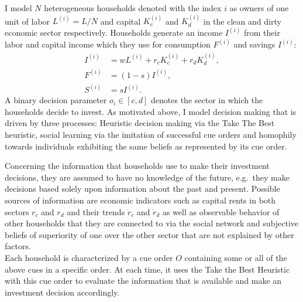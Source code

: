 I model $N$ heterogeneous households denoted with the index $i$ as owners of one unit of labor $L^{(i)} = L/N$ and capital $K_c^{(i)}$ and $K_d^{(i)}$ in the clean and dirty economic sector respectively.
Households generate an income $I^{(i)}$ from their labor and capital income which they use for consumption $F^{(i)}$ and savings $I^{(i)}$:
\begin{align}
	I^{(i)} &= w L^{(i)} + r_c K_c^{(i)} + r_d K_d^{(i)}, \label{eq:household_income} \\
	F^{(i)} &= (1-s) I^{(i)}, \label{eq:consumption} \\
	S^{(i)} &= s I^{(i)}. \label{eq:savings}
\end{align}
A binary decision parameter $o_i \in [c,d]$ denotes the sector in which the households decide to invest. As motivated above, I model decision making that is driven by three processes: Heuristic decision making via the Take The Best heuristic, social learning via the imitation of successful cue orders and homophily towards individuals exhibiting the same beliefs as represented by its cue order. \par

Concerning the information that households use to make their investment decisions, they are assumed to have no knowledge of the future, e.g.\ they make decisions based solely upon information about the past and present. Possible sources of information are economic indicators such as capital rents in both sectors $r_c$ and $r_d$ and their trends $\dot{r}_c$ and $\dot{r}_d$ as well as observable behavior of other households that they are connected to via the social network and subjective beliefs of superiority of one over the other sector that are not explained by other factors.\\
Each household is characterized by a cue order $O$ containing some or all of the above cues in a specific order. At each time, it uses the Take the Best Heuristic with this cue order to evaluate the information that is available and make an investment decision accordingly.
\par

